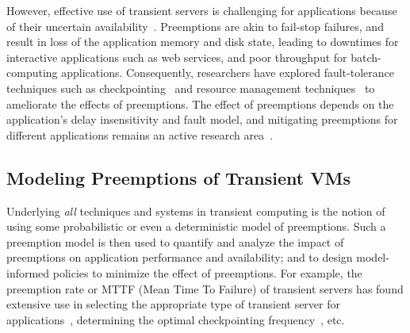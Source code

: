 
However, effective use of transient servers is challenging for applications because of their uncertain availability~\cite{transient}. 
Preemptions are akin to fail-stop failures, and result in loss of the application memory and disk state, leading to downtimes for interactive applications such as web services, and poor throughput for batch-computing applications. 
Consequently, researchers have explored fault-tolerance techniques such as checkpointing~\cite{flint, marathe2014exploiting, spoton} and resource management techniques~\cite{exosphere} to ameliorate the effects of preemptions. %
The effect of preemptions depends on the application's delay insensitivity and fault model, and mitigating preemptions for different applications remains an active research area~\cite{hourglass-eurosys19}. 




\vspace*{\subsecspace}
\subsection{Modeling Preemptions of Transient VMs}


Underlying \emph{all} techniques and systems in transient computing is the notion of using some probabilistic or even a deterministic model of  preemptions. 
%
Such a preemption model is then used to quantify and analyze the impact of preemptions on application performance and availability; and to design model-informed policies to minimize the effect of preemptions. 
%
For example, the preemption rate or MTTF (Mean Time To Failure) of transient servers has found extensive use in selecting the appropriate type of transient server for applications~\cite{exosphere, spoton}, determining the optimal checkpointing frequency~\cite{flint, marathe2014exploiting, proteus-eur17, ghit-spark-hpdc}, etc. 


